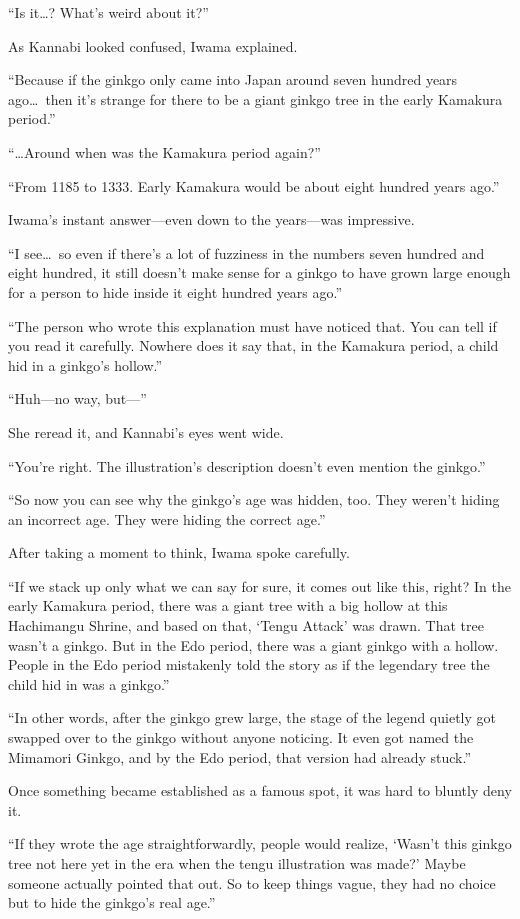 \documentclass[
    a4paper,
    12pt,
    twoside,
    openany,
    UTF8,
    fontset=windows
]{ctexbook}
\begin{document}
``Is it\dots? What's weird about it?''

As Kannabi looked confused, Iwama explained.

``Because if the ginkgo only came into Japan around seven hundred years ago\dots\ then it's strange for there to be a giant ginkgo tree in the early Kamakura period.''

``\dots Around when was the Kamakura period again?''

``From 1185 to 1333. Early Kamakura would be about eight hundred years ago.''

Iwama's instant answer---even down to the years---was impressive.

``I see\dots\ so even if there's a lot of fuzziness in the numbers seven hundred and eight hundred, it still doesn't make sense for a ginkgo to have grown large enough for a person to hide inside it eight hundred years ago.''

``The person who wrote this explanation must have noticed that. You can tell if you read it carefully. Nowhere does it say that, in the Kamakura period, a child hid in a ginkgo's hollow.''

``Huh---no way, but---''

She reread it, and Kannabi's eyes went wide.

``You're right. The illustration's description doesn't even mention the ginkgo.''

``So now you can see why the ginkgo's age was hidden, too. They weren't hiding an incorrect age. They were hiding the correct age.''

After taking a moment to think, Iwama spoke carefully.

``If we stack up only what we can say for sure, it comes out like this, right? In the early Kamakura period, there was a giant tree with a big hollow at this Hachimangu Shrine, and based on that, `Tengu Attack' was drawn. That tree wasn't a ginkgo. But in the Edo period, there was a giant ginkgo with a hollow. People in the Edo period mistakenly told the story as if the legendary tree the child hid in was a ginkgo.''

``In other words, after the ginkgo grew large, the stage of the legend quietly got swapped over to the ginkgo without anyone noticing. It even got named the Mimamori Ginkgo, and by the Edo period, that version had already stuck.''

Once something became established as a famous spot, it was hard to bluntly deny it.

``If they wrote the age straightforwardly, people would realize, `Wasn't this ginkgo tree not here yet in the era when the tengu illustration was made?' Maybe someone actually pointed that out. So to keep things vague, they had no choice but to hide the ginkgo's real age.''
\end{document}
